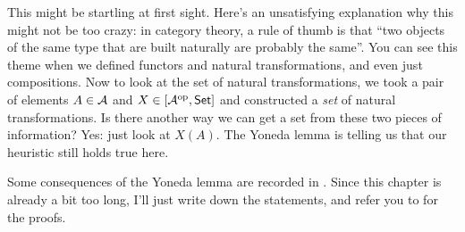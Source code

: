 This might be startling at first sight.
Here's an unsatisfying explanation why this might not be too crazy:
in category theory, a rule of thumb is that ``two objects of the same type
that are built naturally are probably the same''.
You can see this theme when we defined functors and natural transformations,
and even just compositions.
Now to look at the set of natural transformations, we took a pair of elements $A \in \AA$
and $X \in [\AA\op, \catname{Set}]$
and constructed a \emph{set} of natural transformations.
Is there another way we can get a set from these two pieces of information?
Yes: just look at $X(A)$.
The Yoneda lemma is telling us that our heuristic still holds true here.

Some consequences of the Yoneda lemma are recorded in \cite{ref:msci}.
Since this chapter is already a bit too long, I'll just write down the statements,
and refer you to \cite{ref:msci} for the proofs.

